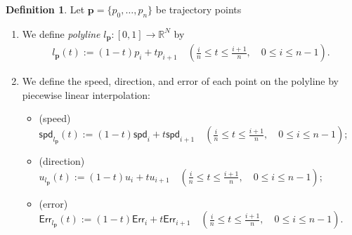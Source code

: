 \documentclass{article}
\numberwithin{equation}{section}
\theoremstyle{definition}
\newtheorem{definition}{Definition}[section]
\newcommand{\err}{\mathsf{Err}}
\newcommand{\R}{\mathbb{R}}
\newcommand{\spd}{\mathsf{spd}}
\begin{document}
\begin{definition}
    Let $\mathbf{p}=\{p_{0},\dots,p_{n}\}$ be trajectory points
    \begin{enumerate}
        \item
        We define \emph{polyline} $l_{\mathbf{p}}:[0,1]\to\R^{N}$ by
        \begin{align}
            l_{\mathbf{p}}(t) := (1-t)p_{i}+tp_{i+1} \quad\left(\frac{i}{n}\le t \le\frac{i+1}{n}, \quad 0\le i\le n-1\right).
        \end{align}
        \item
        We define the speed, direction, and error of each point on the polyline by piecewise linear interpolation: 
        \begin{itemize}
            \item
            (speed) 
            $\spd_{l_{\mathbf{p}}}(t) := (1-t)\spd_{i}+t\spd_{i+1} \quad\left(\frac{i}{n}\le t \le\frac{i+1}{n}, \quad 0\le i\le n-1\right)$;
            \item
            (direction) 
            $u_{l_{\textbf{p}}}(t) := (1-t)u_{i}+tu_{i+1} \quad\left(\frac{i}{n}\le t \le\frac{i+1}{n}, \quad 0\le i\le n-1\right)$; 
            \item
            (error)
            $\err_{l_{\mathbf{p}}}(t) := (1-t)\err_{i}+t\err_{i+1} \quad\left(\frac{i}{n}\le t \le\frac{i+1}{n}, \quad 0\le i\le n-1\right)$.
        \end{itemize}
    \end{enumerate}
\end{definition}
\end{document}
